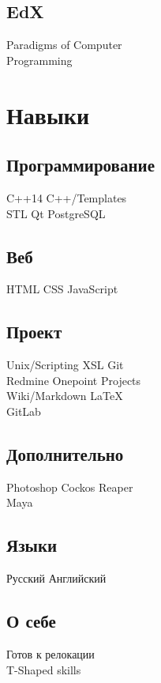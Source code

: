 \documentclass[a4paper]{curricula-vitae}
\begin{document}
\begin{minipage}[t]{0.33\textwidth}
\insertspace

\subsection{EdX}
Paradigms of Computer \\
Programming

\insertspace

\section{Навыки}

\subsection{Программирование}
C++14 \textbullet{} C++/Templates \\
STL \textbullet{} Qt \textbullet{} PostgreSQL


\insertspace

\subsection{Веб}
HTML \textbullet{} CSS \textbullet{} JavaScript

\insertspace

\subsection{Проект}
Unix/Scripting \textbullet{} XSL \textbullet{} Git \\
Redmine \textbullet{} Onepoint Projects \\
Wiki/Markdown \textbullet{} \LaTeX \\
GitLab

\insertspace

\subsection{Дополнительно}
Photoshop \textbullet{} Cockos Reaper \\
Maya

\insertspace

\subsection{Языки}
Русский \textbullet{} Английский

\insertspace

\subsection{О себе}
Готов к релокации \\
T-Shaped skills

\insertspace
\insertspace



\end{minipage}%
\end{document}
